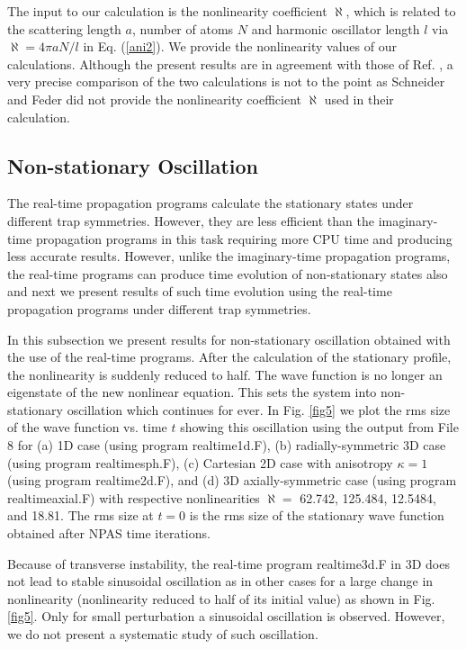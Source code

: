 \documentclass[onecolumn]{elsart3p}
\begin{document}
The input to our calculation is the nonlinearity coefficient $ \aleph$, 
which is related to the scattering length $a$, number of atoms $N$ and
harmonic oscillator length $l$ via $\aleph %
=4\pi a N/l$ in Eq.
(\ref{ani2}). We provide the nonlinearity values of our calculations.
Although the present results are in agreement with those of Ref.
\cite{Schneider_Feder}, a
very precise comparison of the two calculations
 is not to the point as Schneider and Feder  did not provide the
nonlinearity coefficient $\aleph %
$ used in their calculation.






\subsection{Non-stationary Oscillation}


The real-time propagation programs calculate the stationary states under
different trap symmetries. However, they are less efficient than the
imaginary-time propagation programs in this task requiring more CPU
time and producing less accurate results. However, unlike the
imaginary-time propagation programs, the real-time programs  can produce
time
evolution of non-stationary states also and next we present results of
such time evolution using the real-time propagation programs under
different trap symmetries.

In this subsection we present results for non-stationary oscillation
obtained with the use of the real-time programs. After the calculation
of the  stationary profile, the nonlinearity is suddenly reduced to half.
The wave function is no longer an eigenstate of the new nonlinear
equation. This sets the system into non-stationary oscillation which
continues for ever.  In Fig. \ref{fig5} we plot the rms size of the wave
function vs. time $t$ showing this oscillation using the output from
File 8  for (a)  1D case (using program realtime1d.F), (b)
radially-symmetric 3D case (using program realtimesph.F), (c)
Cartesian 2D case with anisotropy $\kappa=1$ (using program
realtime2d.F), and (d) 3D axially-symmetric case (using program 
realtimeaxial.F)  with  respective
nonlinearities $\aleph=$ %
62.742, 125.484, 12.5484, and 18.81.
The rms size at $t=0$
is the rms size of the stationary wave function obtained after NPAS time
iterations.

Because of transverse instability, the real-time program 
realtime3d.F in 3D does not lead to stable sinusoidal oscillation as in 
other
cases for a large change in nonlinearity (nonlinearity reduced to half 
of 
its initial value) as shown in Fig. \ref{fig5}.
Only for small perturbation a sinusoidal oscillation is observed.
However, we do not present a systematic study of such oscillation.
\end{document}
